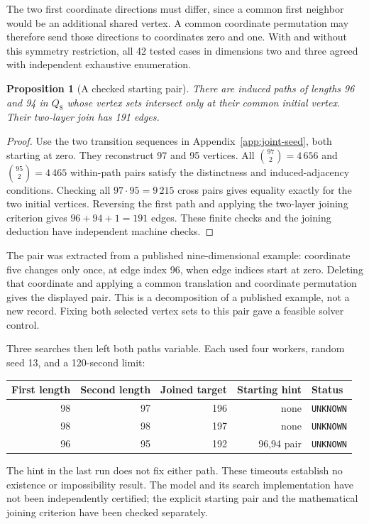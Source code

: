 \documentclass[11pt,a4paper]{article}
\newtheorem{proposition}[theorem]{Proposition}
\theoremstyle{definition}
\theoremstyle{remark}
\newcommand{\Q}{Q}
\begin{document}
The two first coordinate directions must differ, since a common first neighbor would be an additional shared vertex. A common coordinate permutation may therefore send those directions to coordinates zero and one. With and without this symmetry restriction, all 42 tested cases in dimensions two and three agreed with independent exhaustive enumeration.

\begin{proposition}[A checked starting pair]\label{prop:joint-seed}
There are induced paths of lengths 96 and 94 in $\Q_8$ whose vertex sets intersect only at their common initial vertex. Their two-layer join has 191 edges.
\end{proposition}
\begin{proof}
Use the two transition sequences in Appendix~\ref{app:joint-seed}, both starting at zero. They reconstruct 97 and 95 vertices. All $\binom{97}{2}=4\,656$ and $\binom{95}{2}=4\,465$ within-path pairs satisfy the distinctness and induced-adjacency conditions. Checking all $97\cdot95=9\,215$ cross pairs gives equality exactly for the two initial vertices. Reversing the first path and applying the two-layer joining criterion gives $96+94+1=191$ edges. These finite checks and the joining deduction have independent machine checks.
\end{proof}

The pair was extracted from a published nine-dimensional example: coordinate five changes only once, at edge index 96, when edge indices start at zero. Deleting that coordinate and applying a common translation and coordinate permutation gives the displayed pair. This is a decomposition of a published example, not a new record. Fixing both selected vertex sets to this pair gave a feasible solver control.

Three searches then left both paths variable. Each used four workers, random seed 13, and a 120-second limit:
\begin{center}
\begin{tabular}{rrrrl}
\toprule
First length & Second length & Joined target & Starting hint & Status\\
\midrule
98 & 97 & 196 & none & \texttt{UNKNOWN}\\
98 & 98 & 197 & none & \texttt{UNKNOWN}\\
96 & 95 & 192 & 96,94 pair & \texttt{UNKNOWN}\\
\bottomrule
\end{tabular}
\end{center}
The hint in the last run does not fix either path. These timeouts establish no existence or impossibility result. The model and its search implementation have not been independently certified; the explicit starting pair and the mathematical joining criterion have been checked separately.
\end{document}
